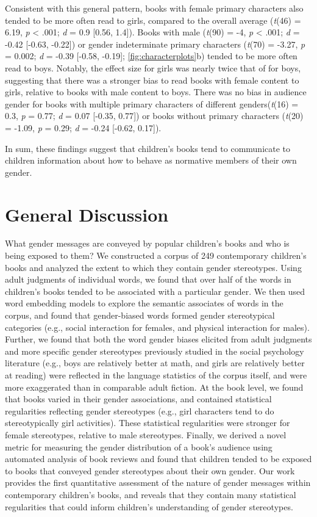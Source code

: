 \documentclass[english,,man,floatsintext]{apa6}
\begin{document}
Consistent with this general pattern, books with female primary characters also tended to be more often read to girls, compared to the overall average (\emph{t}(46) = 6.19, \emph{p} \textless{} .001; \emph{d} = 0.9 {[}0.56, 1.4{]}). Books with male (\emph{t}(90) = -4, \emph{p} \textless{} .001; \emph{d} = -0.42 {[}-0.63, -0.22{]}) or gender indeterminate primary characters (\emph{t}(70) = -3.27, \emph{p} = 0.002; \emph{d} = -0.39 {[}-0.58, -0.19{]}; \autoref{fig:characterplots}b) tended to be more often read to boys. Notably, the effect size for girls was nearly twice that of for boys, suggesting that there was a stronger bias to read books with female content to girls, relative to books with male content to boys. There was no bias in audience gender for books with multiple primary characters of different genders(\emph{t}(16) = 0.3, \emph{p} = 0.77; \emph{d} = 0.07 {[}-0.35, 0.77{]}) or books without primary characters (\emph{t}(20) = -1.09, \emph{p} = 0.29; \emph{d} = -0.24 {[}-0.62, 0.17{]}).

In sum, these findings suggest that children's books tend to communicate to children information about how to behave as normative members of their own gender.

\hypertarget{general-discussion}{%
\section{General Discussion}\label{general-discussion}}

What gender messages are conveyed by popular children's books and who is being exposed to them? We constructed a corpus of 249 contemporary children's books and analyzed the extent to which they contain gender stereotypes. Using adult judgments of individual words, we found that over half of the words in children's books tended to be associated with a particular gender. We then used word embedding models to explore the semantic associates of words in the corpus, and found that gender-biased words formed gender stereotypical categories (e.g., social interaction for females, and physical interaction for males). Further, we found that both the word gender biases elicited from adult judgments and more specific gender stereotypes previously studied in the social psychology literature (e.g., boys are relatively better at math, and girls are relatively better at reading) were reflected in the language statistics of the corpus itself, and were more exaggerated than in comparable adult fiction. At the book level, we found that books varied in their gender associations, and contained statistical regularities reflecting gender stereotypes (e.g., girl characters tend to do stereotypically girl activities). These statistical regularities were stronger for female stereotypes, relative to male stereotypes. Finally, we derived a novel metric for measuring the gender distribution of a book's audience using automated analysis of book reviews and found that children tended to be exposed to books that conveyed gender stereotypes about their own gender. Our work provides the first quantitative assessment of the nature of gender messages within contemporary children's books, and reveals that they contain many statistical regularities that could inform children's understanding of gender stereotypes.
\end{document}
